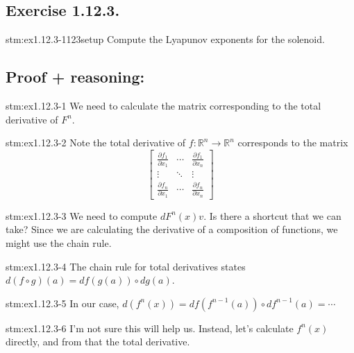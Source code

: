 \subsection*{Exercise 1.12.3.}

\begin{exercise}{stm:ex1.12.3-1123setup}
Compute the Lyapunov exponents for the solenoid.
\end{exercise}

\subsection*{Proof {\color{blue}+ reasoning}:}

\begin{explanation}{stm:ex1.12.3-1}
We need to calculate the matrix corresponding to the total derivative of $F^n$.
\end{explanation}

\begin{explanation}{stm:ex1.12.3-2}
Note the total derivative of $f \colon \mathbb{R}^n \to \mathbb{R}^n$ corresponds to the matrix
\[
\left[
\begin{array}{ccc}
\frac{\partial f_1}{\partial x_1} & \cdots & \frac{\partial f_1}{\partial x_n} \\
\vdots & \ddots & \vdots \\
\frac{\partial f_n}{\partial x_1} & \cdots & \frac{\partial f_n}{\partial x_n}
\end{array}
\right]
\]
\end{explanation}

\begin{explanation}{stm:ex1.12.3-3}
We need to compute $dF^n(x)v$. Is there a shortcut that we can take? Since we are calculating the derivative of a composition of functions, we might use the chain rule.
\end{explanation}

\begin{explanation}{stm:ex1.12.3-4}
The chain rule for total derivatives states $d(f \circ g)(a) = df(g(a)) \circ dg(a)$.
\end{explanation}

\begin{explanation}{stm:ex1.12.3-5}
In our case, $d(f^n(x)) = df(f^{n-1}(a)) \circ df^{n-1}(a) = \cdots$
\end{explanation}

\begin{explanation}{stm:ex1.12.3-6}
I'm not sure this will help us. Instead, let's calculate $f^n(x)$ directly, and from that the total derivative.
\end{explanation}

